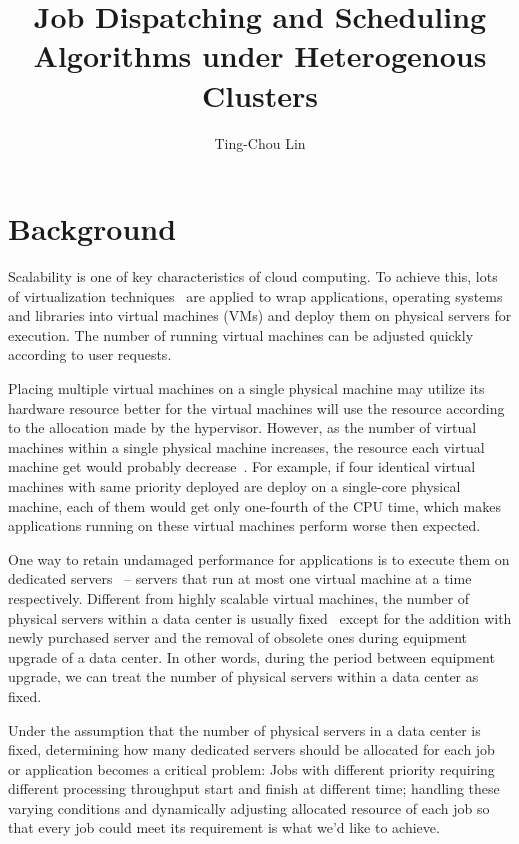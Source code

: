 \documentclass[11pt]{article}
\title{\textbf{Job Dispatching and Scheduling Algorithms under Heterogenous Clusters}}
\author{Ting-Chou Lin\\}
\date{}
\begin{document}
\maketitle

\section{Background}

Scalability is one of key characteristics of cloud computing.  To
achieve this, lots of virtualization
techniques~\cite{secure_virt_for_cloud, cloud_issue} are applied to wrap
applications, operating systems and libraries into virtual machines
(VMs) and deploy them on physical servers for execution.  The number of
running virtual machines can be adjusted quickly according to user
requests.

Placing multiple virtual machines on a single physical machine may
utilize its hardware resource better for the virtual machines will use
the resource according to the allocation made by the hypervisor.
However, as the number of virtual machines within a single physical
machine increases, the resource each virtual machine get would probably
decrease~\cite{resource_overbooking}.  For example, if four identical
virtual machines with same priority deployed are deploy on a single-core
physical machine, each of them would get only one-fourth of the CPU
time, which makes applications running on these virtual machines perform
worse then expected.

One way to retain undamaged performance for applications is to execute
them on dedicated servers~\cite{dedicated_hosting} -- servers that run
at most one virtual machine at a time respectively.  Different from
highly scalable virtual machines, the number of physical servers within
a data center is usually fixed~\cite{maintenance_framework} except for the
addition with newly purchased server and the removal of obsolete ones
during equipment upgrade of a data center.  In other words, during the
period between equipment upgrade, we can treat the number of physical
servers within a data center as fixed.

Under the assumption that the number of physical servers in a data
center is fixed, determining how many dedicated servers should be
allocated for each job or application becomes a critical problem:  Jobs
with different priority requiring different processing throughput start
and finish at different time; handling these varying conditions and
dynamically adjusting allocated resource of each job so that every job
could meet its requirement is what we'd like to achieve.
\end{document}

